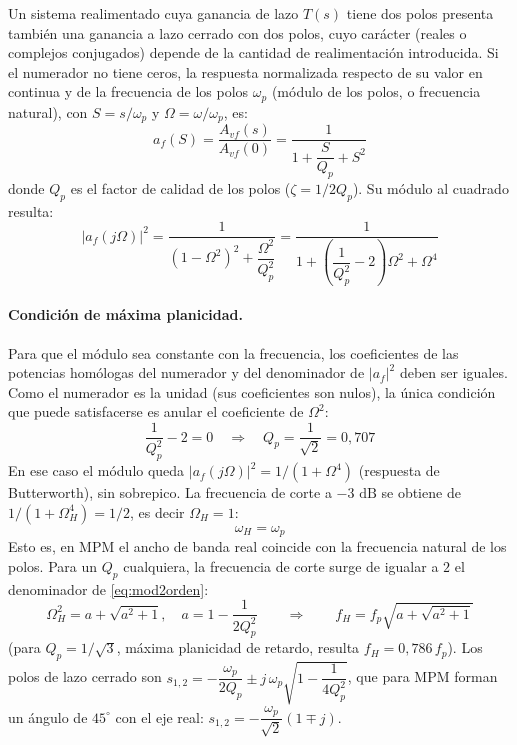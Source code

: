 Un sistema realimentado cuya ganancia de lazo $T(s)$ tiene dos polos presenta también una ganancia a lazo cerrado con dos polos, cuyo carácter (reales o complejos conjugados) depende de la cantidad de realimentación introducida. Si el numerador no tiene ceros, la respuesta normalizada respecto de su valor en continua y de la frecuencia de los polos $\omega_p$ (módulo de los polos, o frecuencia natural), con $S = s/\omega_p$ y $\Omega = \omega/\omega_p$, es:
\begin{equation}
    a_f(S) = \frac{A_{vf}(s)}{A_{vf}(0)} = \frac{1}{1 + \dfrac{S}{Q_p} + S^2}
    \label{eq:2orden}
\end{equation}
donde $Q_p$ es el factor de calidad de los polos ($\zeta = 1/2Q_p$). Su módulo al cuadrado resulta:
\begin{equation}
    |a_f(j\Omega)|^2 = \frac{1}{(1-\Omega^2)^2 + \dfrac{\Omega^2}{Q_p^2}} = \frac{1}{1 + \left(\dfrac{1}{Q_p^2}-2\right)\Omega^2 + \Omega^4}
    \label{eq:mod2orden}
\end{equation}

\paragraph{Condición de máxima planicidad.} Para que el módulo sea constante con la frecuencia, los coeficientes de las potencias homólogas del numerador y del denominador de $|a_f|^2$ deben ser iguales. Como el numerador es la unidad (sus coeficientes son nulos), la única condición que puede satisfacerse es anular el coeficiente de $\Omega^2$:
\begin{equation}
    \frac{1}{Q_p^2} - 2 = 0 \quad \Rightarrow \quad Q_p = \frac{1}{\sqrt{2}} = 0{,}707
    \label{eq:Q_MPM}
\end{equation}
En ese caso el módulo queda $|a_f(j\Omega)|^2 = 1/(1+\Omega^4)$ (respuesta de Butterworth), sin sobrepico. La frecuencia de corte a $-3\text{ dB}$ se obtiene de $1/(1+\Omega_H^4) = 1/2$, es decir $\Omega_H = 1$:
\begin{equation}
    \omega_H = \omega_p
    \label{eq:wH_wp}
\end{equation}
Esto es, en MPM el ancho de banda real coincide con la frecuencia natural de los polos. Para un $Q_p$ cualquiera, la frecuencia de corte surge de igualar a $2$ el denominador de \autoref{eq:mod2orden}:
\begin{equation}
    \Omega_H^2 = a + \sqrt{a^2+1}, \quad a = 1 - \frac{1}{2Q_p^2} \qquad\Rightarrow\qquad f_H = f_p\sqrt{a + \sqrt{a^2+1}}
    \label{eq:polos_BW}
\end{equation}
(para $Q_p = 1/\sqrt{3}$, máxima planicidad de retardo, resulta $f_H = 0{,}786\,f_p$). Los polos de lazo cerrado son $s_{1,2} = -\dfrac{\omega_p}{2Q_p} \pm j\,\omega_p\sqrt{1 - \dfrac{1}{4Q_p^2}}$, que para MPM forman un ángulo de $45^\circ$ con el eje real: $s_{1,2} = -\dfrac{\omega_p}{\sqrt{2}}(1 \mp j)$.

